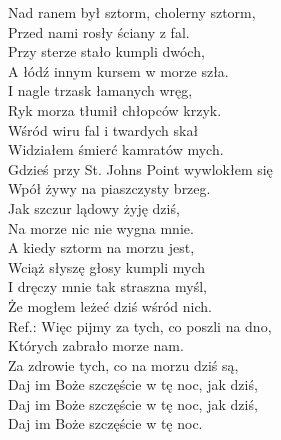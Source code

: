 Nad ranem był sztorm, cholerny sztorm, \\
Przed nami rosły ściany z fal. \\
Przy sterze stało kumpli dwóch, \\
A łódź innym kursem w morze szła. \\
I nagle trzask łamanych wręg, \\
Ryk morza tłumił chłopców krzyk. \\
Wśród wiru fal i twardych skał \\
Widziałem śmierć kamratów mych. \\

Gdzieś przy St. Johns Point wywlokłem się \\
Wpół żywy na piaszczysty brzeg. \\
Jak szczur lądowy żyję dziś, \\
Na morze nic nie wygna mnie. \\
A kiedy sztorm na morzu jest, \\
Wciąż słyszę głosy kumpli mych \\
I dręczy mnie tak straszna myśl, \\
Że mogłem leżeć dziś wśród nich. \\

Ref.: Więc pijmy za tych, co poszli na dno, \\
Których zabrało morze nam. \\
Za zdrowie tych, co na morzu dziś są, \\
Daj im Boże szczęście w tę noc, jak dziś, \\
Daj im Boże szczęście w tę noc, jak dziś, \\
Daj im Boże szczęście w tę noc. \\
